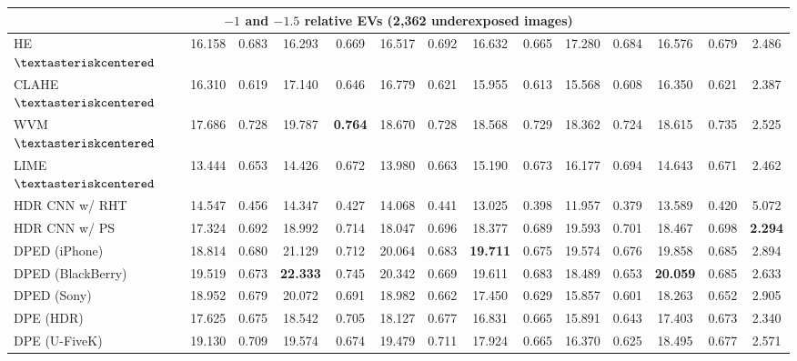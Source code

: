 \documentclass[final]{cvpr}
\begin{document}
\begin{table*}
\begin{center}
{\begin{tabular}{|l|c|c|c|c|c|c|c|c|c|c|c|c|c|}
\multicolumn{14}{|c|}{\cellcolor[HTML]{CCECEB}$-1$ and $-1.5$ relative EVs (2,362 underexposed images)}\\ \hline
HE \cite{10.5555/559707} $\textasteriskcentered$& 16.158 & 0.683 & 16.293 & 0.669 & 16.517  & 0.692 & 16.632 &  0.665 & 17.280 & 0.684 & 16.576 & 0.679 & 2.486\\
CLAHE \cite{adaptivehisteq} $\textasteriskcentered$& 16.310 & 0.619 & 17.140 & 0.646 & 16.779 & 0.621 & 15.955 & 0.613 & 15.568  & 0.608 & 16.350 & 0.621 & 2.387\\
WVM \cite{fu2016weighted} $\textasteriskcentered$& 17.686 & 0.728 & 19.787 & \cellcolor[HTML]{79CC7A}\textbf{0.764} & 18.670 & 0.728 & 18.568 & \cellcolor[HTML]{FFFBA3}0.729 & 18.362 & \cellcolor[HTML]{FFCCCB}0.724 & 18.615 & 0.735 & 2.525\\
\cellcolor[HTML]{D5D5D5}LIME \cite{guo2016lime, guo2017lime} $\textasteriskcentered$& 13.444 & 0.653 & 14.426 & 0.672 & 13.980 & 0.663 & 15.190 & 0.673 & 16.177 & 0.694 & 14.643 & 0.671 & 2.462\\
HDR CNN \cite{HDRCNN} w/ RHT \cite{yang2018image}& 14.547 & 0.456 & 14.347 & 0.427 & 14.068 & 0.441 & 13.025 & 0.398 &  11.957 & 0.379 & 13.589 & 0.420 & 5.072\\
HDR CNN \cite{HDRCNN} w/ PS \cite{dayley2010photoshop}& 17.324 & 0.692 & 18.992 & 0.714 & 18.047 & 0.696 & 18.377 & 0.689 & \cellcolor[HTML]{FFFBA3}19.593 & 0.701 & 18.467 & 0.698 & \cellcolor[HTML]{79CC7A}\textbf{2.294}\\
DPED (iPhone) \cite{DPED}& 18.814 & 0.680 & \cellcolor[HTML]{FFFBA3}21.129 & 0.712 & 20.064 & 0.683 &  \cellcolor[HTML]{79CC7A}\textbf{19.711}  & 0.675 & \cellcolor[HTML]{FFCCCB}19.574  & 0.676 & \cellcolor[HTML]{FFFBA3}19.858 & 0.685 & 2.894\\
DPED (BlackBerry) \cite{DPED} & \cellcolor[HTML]{FFFBA3}19.519 & 0.673 & \cellcolor[HTML]{79CC7A}\textbf{22.333} & 0.745 & 20.342 & 0.669 & 19.611 & 0.683 & 18.489 & 0.653 & \cellcolor[HTML]{79CC7A}\textbf{20.059} & 0.685 & 2.633\\
DPED (Sony) \cite{DPED}& 18.952 & 0.679 & 20.072 & 0.691 & 18.982 &  0.662 & 17.450 & 0.629 & 15.857 & 0.601 & 18.263 & 0.652 & 2.905\\
DPE (HDR) \cite{DPE} & 17.625 & 0.675 & 18.542 & 0.705 & 18.127  & 0.677 & 16.831 & 0.665 & 15.891 & 0.643 & 17.403 & 0.673 & \cellcolor[HTML]{FFFBA3}2.340\\
DPE (U-FiveK) \cite{DPE} & 19.130 & 0.709 & 19.574 & 0.674 & 19.479 & 0.711 & 17.924 & 0.665 & 16.370 & 0.625 & 18.495 & 0.677 & 2.571\\

\end{tabular}}
\end{center}
\end{table*}
\end{document}
